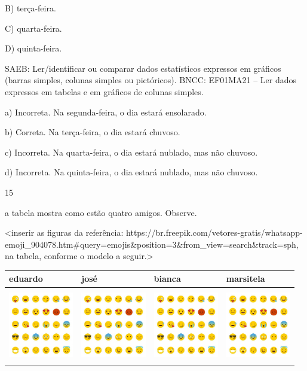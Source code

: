 B) terça-feira.

C) quarta-feira.

D) quinta-feira.

SAEB: Ler/identificar ou comparar dados estatísticos expressos
em gráficos (barras simples, colunas simples ou pictóricos).
BNCC: EF01MA21  -- Ler dados expressos em tabelas e em gráficos de colunas
simples.

a) Incorreta. Na segunda-feira, o dia estará ensolarado.

b) Correta. Na terça-feira, o dia estará chuvoso.

c) Incorreta. Na quarta-feira, o dia estará nublado, mas não chuvoso.

d) Incorreta. Na quinta-feira, o dia estará nublado, mas não chuvoso.

\num{15}

a tabela mostra como estão quatro amigos. Observe.

\textless{}inserir as figuras da referência:
https://br.freepik.com/vetores-gratis/whatsapp-emoji\_904078.htm\#query=emojis\&position=3\&from\_view=search\&track=sph,
na tabela, conforme o modelo a seguir.\textgreater{}

\begin{longtable}[]{@{}llll@{}}
\toprule
eduardo & josé & bianca & marsitela\tabularnewline
\midrule
\endhead
\includegraphics[width=1.11765in,height=1.26042in]{media/image139.jpg} &
\includegraphics[width=1.11765in,height=1.26042in]{media/image139.jpg} &
\includegraphics[width=1.11765in,height=1.12806in]{media/image139.jpg} &
\includegraphics[width=1.11765in,height=1.12806in]{media/image139.jpg}\tabularnewline
\bottomrule
\end{longtable}

